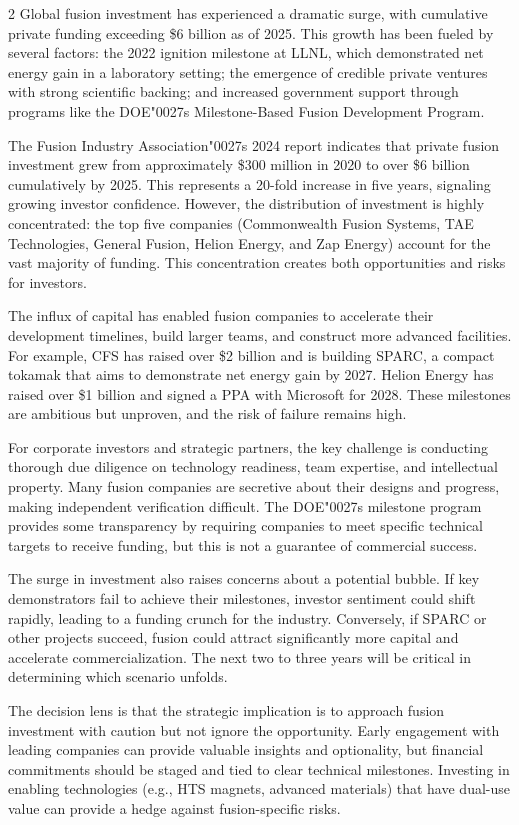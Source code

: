 \documentclass[10pt,a4paper]{article}
\newcommand{\BOApos}{{\BOQuoteFont\char"0027}}
\begin{document}
\begin{multicols}{2}
{\small Global fusion investment has experienced a dramatic surge, with cumulative private funding exceeding \$6 billion as of 2025. This growth has been fueled by several factors: the 2022 ignition milestone at LLNL, which demonstrated net energy gain in a laboratory setting; the emergence of credible private ventures with strong scientific backing; and increased government support through programs like the DOE\BOApos{}s Milestone-Based Fusion Development Program.}\par
{\small The Fusion Industry Association\BOApos{}s 2024 report indicates that private fusion investment grew from approximately \$300 million in 2020 to over \$6 billion cumulatively by 2025. This represents a 20-fold increase in five years, signaling growing investor confidence. However, the distribution of investment is highly concentrated: the top five companies (Commonwealth Fusion Systems, TAE Technologies, General Fusion, Helion Energy, and Zap Energy) account for the vast majority of funding. This concentration creates both opportunities and risks for investors.}\par
{\small The influx of capital has enabled fusion companies to accelerate their development timelines, build larger teams, and construct more advanced facilities. For example, CFS has raised over \$2 billion and is building SPARC, a compact tokamak that aims to demonstrate net energy gain by 2027. Helion Energy has raised over \$1 billion and signed a PPA with Microsoft for 2028. These milestones are ambitious but unproven, and the risk of failure remains high.}\par
{\small For corporate investors and strategic partners, the key challenge is conducting thorough due diligence on technology readiness, team expertise, and intellectual property. Many fusion companies are secretive about their designs and progress, making independent verification difficult. The DOE\BOApos{}s milestone program provides some transparency by requiring companies to meet specific technical targets to receive funding, but this is not a guarantee of commercial success.}\par
{\small The surge in investment also raises concerns about a potential bubble. If key demonstrators fail to achieve their milestones, investor sentiment could shift rapidly, leading to a funding crunch for the industry. Conversely, if SPARC or other projects succeed, fusion could attract significantly more capital and accelerate commercialization. The next two to three years will be critical in determining which scenario unfolds.}\par
{\small The decision lens is that the strategic implication is to approach fusion investment with caution but not ignore the opportunity. Early engagement with leading companies can provide valuable insights and optionality, but financial commitments should be staged and tied to clear technical milestones. Investing in enabling technologies (e.g., HTS magnets, advanced materials) that have dual-use value can provide a hedge against fusion-specific risks.}\par
\end{multicols}
\label{chap:3:end}
\end{document}
